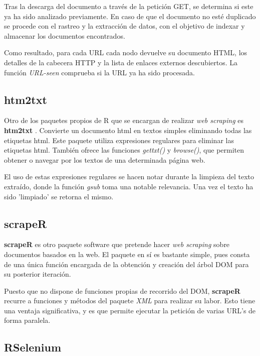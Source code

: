 Tras la descarga del documento a través de la petición GET, se determina si este ya ha sido analizado 
previamente. En caso de que el documento no esté duplicado se procede con el rastreo y la extracción de
datos, con el objetivo de indexar y almacenar los documentos encontrados.

Como resultado, para cada URL cada nodo devuelve su documento HTML, los detalles de la cabecera HTTP y la 
lista de enlaces externos descubiertos. La función \emph{URL-seen} comprueba si la URL ya ha sido procesada.

\subsection{htm2txt}
\label{subsec:htm2txt}

Otro de los paquetes propios de R que se encargan de realizar \emph{web scraping} es \textbf{htm2txt} 
\cite{htm2txt-cran}. Convierte un documento html en textos simples eliminando todas las etiquetas html. 
Este paquete utiliza expresiones regulares para eliminar las etiquetas html. También ofrece las funciones 
\emph{gettxt()} y \emph{browse()}, que permiten obtener o navegar por los textos de una determinada página 
web.

El uso de estas expresiones regulares se hacen notar durante la limpieza del texto extraído, donde la
función \emph{gsub} toma una notable relevancia. Una vez el texto ha sido 'limpiado' se retorna el mismo.

\subsection{scrapeR}
\label{subsec:scraper}

\textbf{scrapeR} \cite{scraper-cran} es otro paquete software que pretende hacer \emph{web scraping} sobre 
documentos basados en la web. El paquete en sí es bastante simple, pues consta de una única función 
encargada de la obtención y creación del árbol DOM para su posterior iteración.

Puesto que no dispone de funciones propias de recorrido del DOM, \textbf{scrapeR} recurre a funciones y
métodos del paquete \emph{XML} para realizar su labor. Esto tiene una ventaja significativa, y es que
permite ejecutar la petición de varias URL's de forma paralela.

\subsection{RSelenium}
\label{subsec:rselenium}

